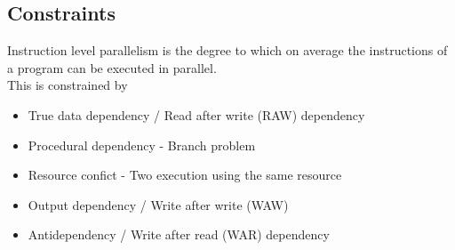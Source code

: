 \documentclass[12pt, a4paper]{article}
\begin{document}
		\subsection{Constraints}
			Instruction level parallelism is the degree to which on average the instructions of a program can be executed in parallel.\\
			This is constrained by
			\begin{itemize}
				\item True data dependency / Read after write (RAW) dependency
				\item Procedural dependency - Branch problem
				\item Resource confict - Two execution using the same resource
				\item Output dependency / Write after write (WAW)
				\item Antidependency / Write after read (WAR) dependency
			\end{itemize}
\end{document}
